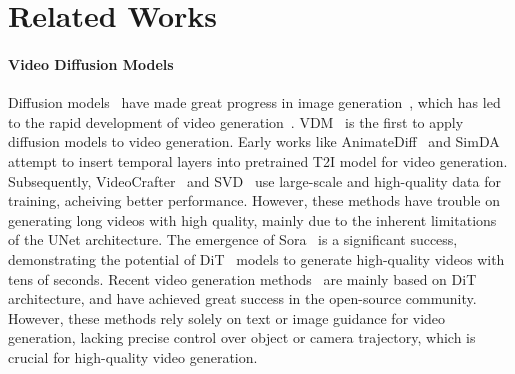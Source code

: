 \section{Related Works}
\label{sec:formatting}

\paragraph{Video Diffusion Models}
Diffusion models~\cite{ho2020denoising, song2020denoising, song2020score, liu2022flow} have made great progress in image generation~\cite{dhariwal2021diffusion, nichol2021glide, ramesh2021zero, rombach2022high, saharia2022photorealistic, ramesh2022hierarchical, zhang2024creatilayout, zhang2025creatidesign, zhang2023adadiff, zhang2025blockdance, wang2025simplear, zhang2025reasongen}, which has led to the rapid development of video generation~\cite{ho2022video, wu2023tune, khachatryan2023text2video, guo2023animatediff, blattmann2023stable, zheng2024open, hong2022cogvideo, yang2024cogvideox, kong2024hunyuanvideo, xing2024survey, xing2024aid, xing2023vidiff, xie2025human2robot, du2024challenge, tu2024motioneditor, tu2024motionfollower, tu2025stableanimator, tu2025stableanimator++, tian2025unigen}.
VDM~\cite{ho2022video} is the first to apply diffusion models to video generation. 
Early works like AnimateDiff~\cite{guo2023animatediff} and SimDA~\cite{xing2024simda} attempt to insert temporal layers into pretrained T2I model for video generation.
Subsequently, VideoCrafter~\cite{chen2023videocrafter1} and SVD~\cite{blattmann2023stable} use large-scale and high-quality data for training, acheiving better performance.
However, these methods have trouble on generating long videos with high quality, mainly due to the inherent limitations of the UNet architecture.
The emergence of Sora~\cite{videoworldsimulators2024} is a significant success, demonstrating the potential of DiT~\cite{Peebles2022DiT} models to generate high-quality videos with tens of seconds.
Recent video generation methods~\cite{zheng2024open, yang2024cogvideox, kong2024hunyuanvideo} are mainly based on DiT architecture, and have achieved great success in the open-source community.
However, these methods rely solely on text or image guidance for video generation, lacking precise control over object or camera trajectory, which is crucial for high-quality video generation.

\vspace{-1em}

